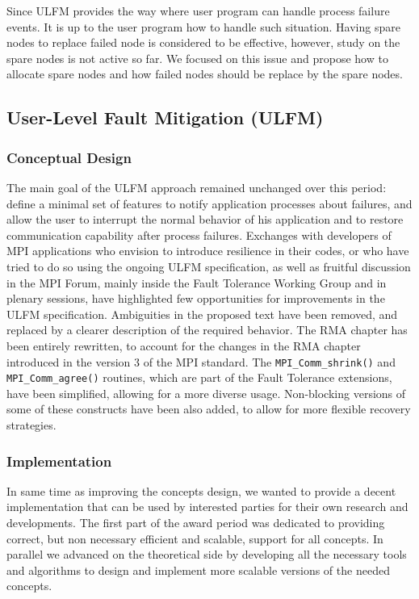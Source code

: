 Since ULFM provides the way where user program can handle process
failure events. It is up to the user program how to handle such
situation. Having spare nodes to replace failed node is considered to
be effective, however, study on the spare nodes is not active so far. We
focused on this issue and propose how to allocate spare nodes and how
failed nodes should be replace by the spare nodes. 

\subsection{User-Level Fault Mitigation (ULFM)}

\subsubsection{Conceptual Design}

The main goal of the
ULFM\cite{Herault:2015:PSC:2807591.2807665,Bouteiller:2015:PBI:2802658.2802668,doi:10.1177/1094342013488238}
approach remained unchanged over this 
period: define a minimal set of features to notify application
processes about failures, and allow the user to interrupt the normal
behavior of his application and to restore communication capability
after process failures. Exchanges with developers of MPI applications
who envision to introduce resilience in their codes, or who have tried
to do so using the ongoing ULFM specification, as well as fruitful
discussion in the MPI Forum, mainly inside the Fault Tolerance Working
Group and in plenary sessions, have highlighted few opportunities for
improvements in the ULFM specification. Ambiguities in the proposed
text have been removed, and replaced by a clearer description of the
required behavior. The RMA chapter has been entirely rewritten, to
account for the changes in the RMA chapter introduced in the version 3
of the MPI standard. The {\tt MPI\_Comm\_shrink()} and {\tt
MPI\_Comm\_agree()} routines, 
which are part of the Fault Tolerance extensions, have been
simplified, allowing for a more diverse usage. Non-blocking versions
of some of these constructs have been also added, to allow for more
flexible recovery strategies.

\subsubsection{Implementation}

In same time as improving the concepts design, we wanted to provide a
decent implementation that can be used by interested parties for their
own research and developments. The first part of the award period was
dedicated to providing correct, but non necessary efficient and
scalable, support for all concepts. In parallel we advanced on the
theoretical side by developing all the necessary tools and algorithms
to design and implement more scalable versions of the needed concepts.

